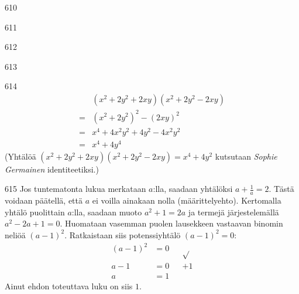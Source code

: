 \begin{Vastaus}{610}
    
\end{Vastaus}
\begin{Vastaus}{611}
    
\end{Vastaus}
\begin{Vastaus}{612}
    
\end{Vastaus}
\begin{Vastaus}{613}
    
\end{Vastaus}
\begin{Vastaus}{614}
	\begin{align*}
		&(x^2+2y^2+2xy)(x^2+2y^2-2xy) \\
		=&(x^2+2y^2)^2-(2xy)^2 \\
		=&x^4+4x^2y^2+4y^2-4x^2y^2 \\
		=&x^4+4y^4
	\end{align*}
	(Yhtälöä $(x^2+2y^2+2xy)(x^2+2y^2-2xy)=x^4+4y^2$ kutsutaan \textit{Sophie Germainen} identiteetiksi.)
	
\end{Vastaus}
\begin{Vastaus}{615}
	Jos tuntematonta lukua merkataan $a$:lla, saadaan yhtälöksi $a+\frac{1}{a}=2$. Tästä voidaan päätellä, että $a$ ei voilla ainakaan nolla (määrittelyehto). Kertomalla yhtälö puolittain $a$:lla, saadaan muoto $a^2+1=2a$ ja termejä järjestelemällä $a^2-2a+1=0$. Huomataan vasemman puolen lausekkeen vastaavan binomin neliöä $(a-1)^2$. Ratkaistaan siis potenssiyhtälö $(a-1)^2=0$:
	\begin{align*}
(a-1)^2&=0 &&\sqrt{ } \\
a-1&=0 &&+1 \\
a&=1 &&
	\end{align*}
	Ainut ehdon toteuttava luku on siis $1$.
	
\end{Vastaus}
